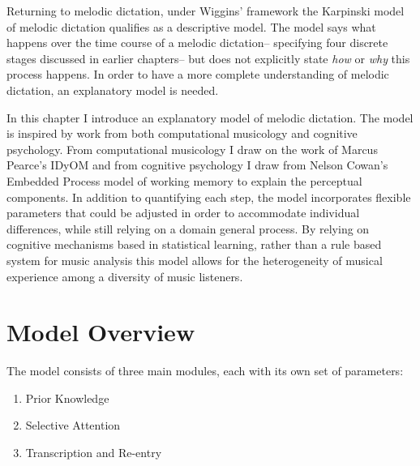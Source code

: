 \documentclass[]{book}
\providecommand{\tightlist}{%
  \setlength{\itemsep}{0pt}\setlength{\parskip}{0pt}}
\theoremstyle{definition}
\theoremstyle{definition}
\theoremstyle{definition}
\theoremstyle{remark}
\begin{document}
Returning to melodic dictation, under Wiggins' framework the Karpinski
model of melodic dictation
\citep{karpinskiAuralSkillsAcquisition2000, karpinskiModelMusicPerception1990}
qualifies as a descriptive model. The model says what happens over the
time course of a melodic dictation-- specifying four discrete stages
discussed in earlier chapters-- but does not explicitly state \emph{how}
or \emph{why} this process happens. In order to have a more complete
understanding of melodic dictation, an explanatory model is needed.

In this chapter I introduce an explanatory model of melodic dictation.
The model is inspired by work from both computational musicology and
cognitive psychology. From computational musicology I draw on the work
of Marcus Pearce's IDyOM
\citep{pearceConstructionEvaluationStatistical2005} and from cognitive
psychology I draw from Nelson Cowan's Embedded Process model of working
memory
\citep{cowanEvolvingConceptionsMemory1988, cowanMagicalMysteryFour2010}
to explain the perceptual components. In addition to quantifying each
step, the model incorporates flexible parameters that could be adjusted
in order to accommodate individual differences, while still relying on a
domain general process. By relying on cognitive mechanisms based in
statistical learning, rather than a rule based system for music analysis
\citep{lerdahlGenerativeTheoryTonal1986, narmourAnalysisCognitionBasic1990, narmourAnalysisCognitionMelodic1992, temperleyCognitionBasicMusical2004}
this model allows for the heterogeneity of musical experience among a
diversity of music listeners.

\hypertarget{model-overview}{%
\section{Model Overview}\label{model-overview}}

The model consists of three main modules, each with its own set of
parameters:

\begin{enumerate}
\def\labelenumi{\arabic{enumi}.}
\tightlist
\item
  Prior Knowledge
\item
  Selective Attention
\item
  Transcription and Re-entry
\end{enumerate}
\end{document}
